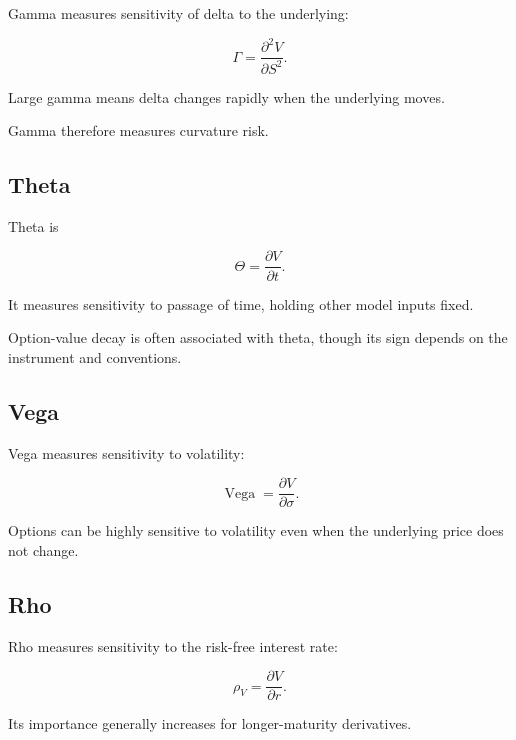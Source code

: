 Gamma measures sensitivity of delta to the underlying:

\[
\boxed{
\Gamma
=
\frac{\partial^2V}{\partial S^2}.
}
\]

Large gamma means delta changes rapidly when the underlying moves.

Gamma therefore measures curvature risk.

\subsection{Theta}
\label{subsec:option-theta}

Theta is

\[
\boxed{
\Theta
=
\frac{\partial V}{\partial t}.
}
\]

It measures sensitivity to passage of time, holding other model inputs fixed.

Option-value decay is often associated with theta, though its sign depends on
the instrument and conventions.

\subsection{Vega}
\label{subsec:option-vega}

Vega measures sensitivity to volatility:

\[
\boxed{
\operatorname{Vega}
=
\frac{\partial V}{\partial\sigma}.
}
\]

Options can be highly sensitive to volatility even when the underlying price
does not change.

\subsection{Rho}
\label{subsec:option-rho}

Rho measures sensitivity to the risk-free interest rate:

\[
\boxed{
\rho_V
=
\frac{\partial V}{\partial r}.
}
\]

Its importance generally increases for longer-maturity derivatives.

